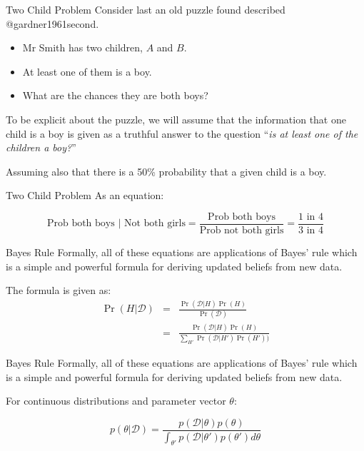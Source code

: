 \documentclass[
  11pt,
  ignorenonframetext,
]{beamer}
\providecommand{\tightlist}{%
  \setlength{\itemsep}{0pt}\setlength{\parskip}{0pt}}\usepackage{longtable,booktabs,array}
\begin{document}
\begin{frame}{Two Child Problem}
\protect\hypertarget{two-child-problem}{}
Consider last an old puzzle found described @gardner1961second.

\begin{itemize}
\tightlist
\item
  Mr Smith has two children, \(A\) and \(B\).
\item
  At least one of them is a boy.
\item
  What are the chances they are both boys?
\end{itemize}

To be explicit about the puzzle, we will assume that the information
that one child is a boy is given as a truthful answer to the question
``\emph{is at least one of the children a boy?}''

Assuming also that there is a 50\% probability that a given child is a
boy.
\end{frame}

\begin{frame}{Two Child Problem}
\protect\hypertarget{two-child-problem-1}{}
As an equation:

\[\text{Prob both boys | Not both girls} = \frac{\text{Prob both boys}}{\text{Prob not both girls}} = \frac{\text{1 in 4}}{\text{3 in 4}}\]
\end{frame}

\begin{frame}{Bayes Rule}
\protect\hypertarget{bayes-rule-1}{}
Formally, all of these equations are applications of Bayes' rule which
is a simple and powerful formula for deriving updated beliefs from new
data.

The formula is given as: \begin{eqnarray}
\Pr(H|\mathcal{D})&=&\frac{\Pr(\mathcal{D}|H)\Pr(H)}{\Pr(\mathcal{D})}\\
                  &=&\frac{\Pr(\mathcal{D}|H)\Pr(H)}{\sum_{H'}\Pr(\mathcal{D}|H')\Pr(H'))}
\end{eqnarray}
\end{frame}

\begin{frame}{Bayes Rule}
\protect\hypertarget{bayes-rule-2}{}
Formally, all of these equations are applications of Bayes' rule which
is a simple and powerful formula for deriving updated beliefs from new
data.

For continuous distributions and parameter vector \(\theta\):

\[p(\theta|\mathcal{D})=\frac{p(\mathcal{D}|\theta)p(\theta)}{\int_{\theta'}p(\mathcal{D|\theta'})p(\theta')d\theta}\]
\end{frame}
\end{document}
